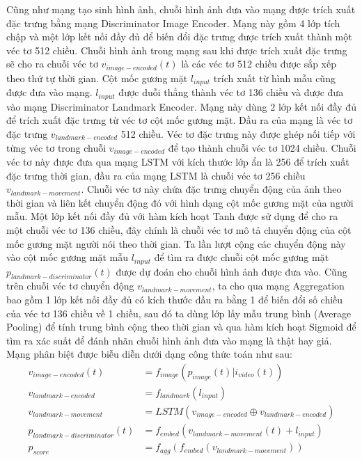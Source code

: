 Cũng như mạng tạo sinh hình ảnh, chuỗi hình ảnh đưa vào mạng được trích xuất đặc trưng bằng mạng Discriminator Image Encoder. Mạng này gồm 4 lớp tích chập và một lớp kết nối đầy đủ để biến đổi đặc trưng được trích xuất thành một véc tơ 512 chiều. Chuỗi hình ảnh trong mạng sau khi được trích xuất đặc trưng sẽ cho ra chuỗi véc tơ $v_{image-encoded}(t)$ là các véc tơ 512 chiều được sắp xếp theo thứ tự thời gian. Cột mốc gương mặt $l_{input}$ trích xuất từ hình mẫu cũng được đưa vào mạng. $l_{input}$ được duỗi thẳng thành véc tơ 136 chiều và được đưa vào mạng Discriminator Landmark Encoder. Mạng này dùng 2 lớp kết nối đầy đủ để trích xuất đặc trưng từ véc tơ cột mốc gương mặt. Đầu ra của mạng là véc tơ đặc trưng $v_{landmark-encoded}$ 512 chiều. Véc tơ đặc trưng này được ghép nối tiếp với từng véc tơ trong chuỗi $v_{image-encoded}$ để tạo thành chuỗi véc tơ 1024 chiều. Chuỗi véc tơ này được đưa qua mạng LSTM với kích thước lớp ẩn là 256 để trích xuất đặc trưng thời gian, đầu ra của mạng LSTM là chuỗi véc tơ 256 chiều $v_{landmark-movement}$. Chuỗi véc tơ này chứa đặc trưng chuyển động của ảnh theo thời gian và liên kết chuyển động đó với hình dạng cột mốc gương mặt của người mẫu. Một lớp kết nối đầy đủ với hàm kích hoạt Tanh được sử dụng để cho ra một chuỗi véc tơ 136 chiều, đây chính là chuỗi véc tơ mô tả chuyển động của cột mốc gương mặt người nói theo thời gian. Ta lần lượt cộng các chuyển động này vào cột mốc gương mặt mẫu $l_{input}$ để tìm ra được chuỗi cột mốc gương mặt $p_{landmark-discriminator}(t)$ được dự đoán cho chuỗi hình ảnh được đưa vào. Cũng trên chuỗi véc tơ chuyển động $v_{landmark-movement}$, ta cho qua mạng Aggregation bao gồm 1 lớp kết nối đầy đủ có kích thước đầu ra bằng 1 để biến đổi số chiều của véc tơ 136 chiều về 1 chiều, sau đó ta dùng lớp lấy mẫu trung bình (Average Pooling) để tính trung bình cộng theo thời gian và qua hàm kích hoạt Sigmoid để tìm ra xác suất để đánh nhãn chuỗi hình ảnh đưa vào mạng là thật hay giả. Mạng phân biệt được biễu diễn dưới dạng công thức toán như sau:
\begin{equation}
    \begin{split}
    v_{image-encoded}(t) &= f_{image}(p_{image}(t)|i_{video}(t))\\
    v_{landmark-encoded} &= f_{landmark}(l_{input})\\
    v_{landmark-movement} &= LSTM(v_{image-encoded} \oplus v_{landmark-encoded})\\
    p_{landmark-discriminator}(t) &= f_{embed}(v_{landmark-movement}(t) + l_{input})\\
    p_{score} &= f_{agg}(f_{embed}(v_{landmark-movement}))
    \end{split}
\end{equation}

